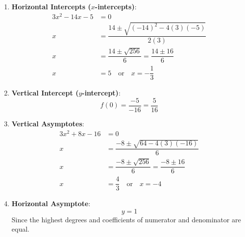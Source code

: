 \documentclass[12pt]{article}
\begin{document}
\begin{enumerate}
    \item \textbf{Horizontal Intercepts (\(x\)-intercepts)}:
    \begin{align*}
        3x^2 - 14x - 5 &= 0 \\
        x &= \dfrac{14 \pm \sqrt{(-14)^2 - 4(3)(-5)}}{2(3)} \\
        x &= \dfrac{14 \pm \sqrt{256}}{6} = \dfrac{14 \pm 16}{6} \\
        x &= 5 \quad \text{or} \quad x = -\dfrac{1}{3}
    \end{align*}

    \item \textbf{Vertical Intercept (\(y\)-intercept)}:
    \[ f(0) = \dfrac{-5}{-16} = \dfrac{5}{16} \]

    \item \textbf{Vertical Asymptotes}:
    \begin{align*}
        3x^2 + 8x - 16 &= 0 \\
        x &= \dfrac{-8 \pm \sqrt{64 - 4(3)(-16)}}{6} \\
        x &= \dfrac{-8 \pm \sqrt{256}}{6} = \dfrac{-8 \pm 16}{6} \\
        x &= \dfrac{4}{3} \quad \text{or} \quad x = -4
    \end{align*}

    \item \textbf{Horizontal Asymptote}:
    \[y=1\]
    Since the highest degrees and coefficients of numerator and denominator are equal.
\end{enumerate}
\end{document}
